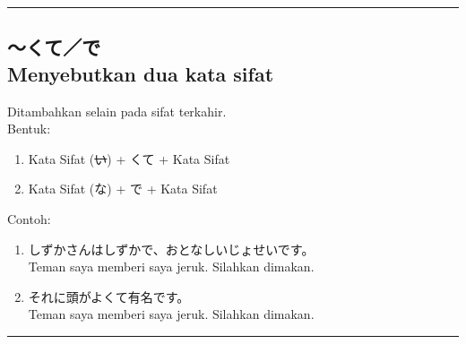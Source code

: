 \vspace{0.2cm}\hrule height 1pt\vspace{0.2cm}


\subsection*{
    ～くて／で \\
    Menyebutkan dua kata sifat
}
Ditambahkan selain pada sifat terkahir.\\
Bentuk:
\begin{enumerate}
    \item Kata Sifat (\sout{い}) + くて + Kata Sifat
    \item Kata Sifat (な) + で + Kata Sifat
\end{enumerate}
Contoh: 
\begin{enumerate}
    \item しずかさんはしずかで、おとなしいじょせいです。
    \\ Teman saya memberi saya jeruk. Silahkan dimakan.
    \item それに頭がよくて有名です。
    \\ Teman saya memberi saya jeruk. Silahkan dimakan.
\end{enumerate}

\vspace{0.2cm}\hrule height 1pt\vspace{0.2cm}

\newpage
